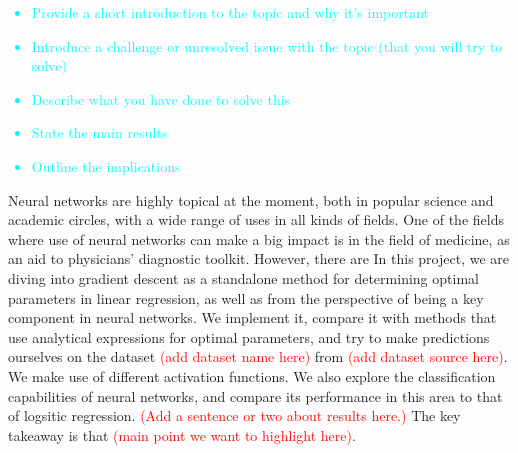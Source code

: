 \begin{adjustwidth}{2cm}{2cm} %
        \textcolor{cyan}{
        \begin{itemize}
            \item Provide a short introduction to the topic and why it's important
            \item Introduce a challenge or unresolved issue with the topic (that you will try to solve)
            \item Describe what you have done to solve this
            \item State the main results
            \item Outline the implications
        \end{itemize}}

        Neural networks are highly topical at the moment, both in popular science and academic circles, with a wide range of uses in all kinds of fields. One of the fields where use of neural networks can make a big impact is in the field of medicine, as an aid to physicians' diagnostic toolkit. However, there are In this project, we are diving into gradient descent as a standalone method for determining optimal parameters in linear regression, as well as from the perspective of being a key component in neural networks. We implement it, compare it with methods that use analytical expressions for optimal parameters, and try to make predictions ourselves on the dataset \textcolor{red}{(add dataset name here)} from \textcolor{red}{(add dataset source here)}. We make use of different activation functions. We also explore the classification capabilities of neural networks, and compare its performance in this area to that of logsitic regression. \textcolor{red}{(Add a sentence or two about results here.)} The key takeaway is that \textcolor{red}{(main point we want to highlight here)}.
      \end{adjustwidth}

